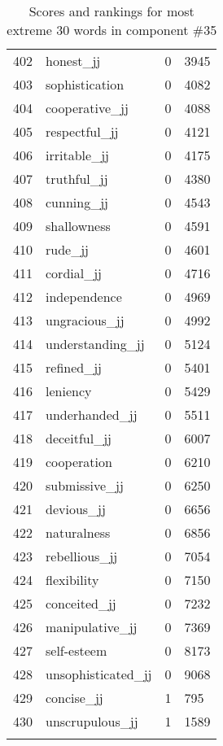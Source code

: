 \begin{longtable}[!htbp]{| rlr@{.}l |}
    402 & honest\_jj & 0 & 3945 \\
    403 & sophistication & 0 & 4082 \\
    404 & cooperative\_jj & 0 & 4088 \\
    405 & respectful\_jj & 0 & 4121 \\
    406 & irritable\_jj & 0 & 4175 \\
    407 & truthful\_jj & 0 & 4380 \\
    408 & cunning\_jj & 0 & 4543 \\
    409 & shallowness & 0 & 4591 \\
    410 & rude\_jj & 0 & 4601 \\
    411 & cordial\_jj & 0 & 4716 \\
    412 & independence & 0 & 4969 \\
    413 & ungracious\_jj & 0 & 4992 \\
    414 & understanding\_jj & 0 & 5124 \\
    415 & refined\_jj & 0 & 5401 \\
    416 & leniency & 0 & 5429 \\
    417 & underhanded\_jj & 0 & 5511 \\
    418 & deceitful\_jj & 0 & 6007 \\
    419 & cooperation & 0 & 6210 \\
    420 & submissive\_jj & 0 & 6250 \\
    421 & devious\_jj & 0 & 6656 \\
    422 & naturalness & 0 & 6856 \\
    423 & rebellious\_jj & 0 & 7054 \\
    424 & flexibility & 0 & 7150 \\
    425 & conceited\_jj & 0 & 7232 \\
    426 & manipulative\_jj & 0 & 7369 \\
    427 & self-esteem & 0 & 8173 \\
    428 & unsophisticated\_jj & 0 & 9068 \\
    429 & concise\_jj & 1 & 795 \\
    430 & unscrupulous\_jj & 1 & 1589 \\
    \hline
    \caption{Scores and rankings for most extreme 30 words in component \#35} \\
\end{longtable}
